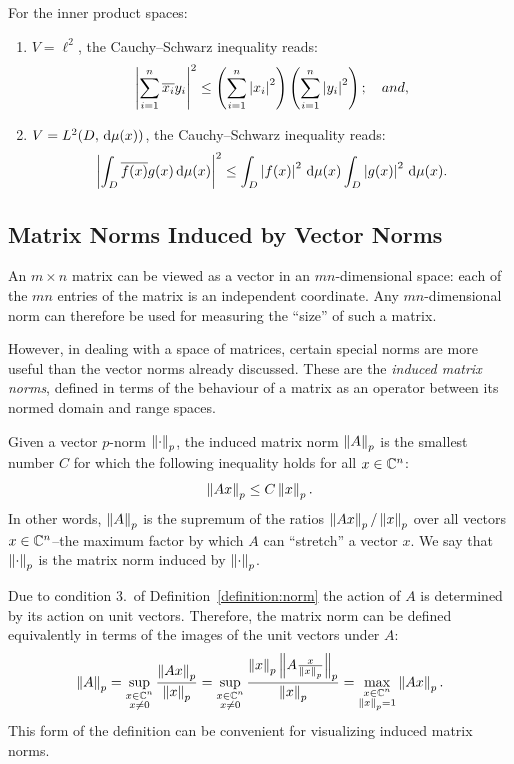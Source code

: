 \begin{example}
For the inner product spaces:
\begin{enumerate}
\item $V=\ell^2$, the Cauchy--Schwarz inequality reads:
\[
\left|{\sum_{i=1}^n \overline{x_i}y_i}\right|^2 \le \left(\sum_{i=1}^n\left|{x_i}\right|^2\right)\left(\sum_{i=1}^n\left|{y_i}\right|^2\right);\quad and,
\]
\item $V=L^2(D,{\rm\,d}\mu(x))$, the Cauchy--Schwarz inequality reads:
\[
\left|{\int_D\overline{f(x)}g(x){\rm\,d}\mu(x)}\right|^2 \le \int_D\left|{f(x)}\right|^2{\rm\,d}\mu(x)\int_D\left|{g(x)}\right|^2{\rm\,d}\mu(x).
\]
\end{enumerate}
\end{example}

\subsection{Matrix Norms Induced by Vector Norms}

An $m\times n$ matrix can be viewed as a vector in an $mn$-dimensional space: each of the $mn$ entries of the matrix is an independent coordinate. Any $mn$-dimensional norm can therefore be used for measuring the ``size'' of such a matrix.

However, in dealing with a space of matrices, certain special norms are more useful than the vector norms already discussed. These are the {\em induced matrix norms}, defined in terms of the behaviour of a matrix as an operator between its normed domain and range spaces.

Given a vector $p$-norm $\left\|{\cdot}\right\|_p$, the induced matrix norm $\left\|{A}\right\|_p$ is the smallest number $C$ for which the following inequality holds for all $x\in\mathbb{C}^n$:
\begin{equation}
\left\|{Ax}\right\|_p \le C\left\|{x}\right\|_p.
\end{equation}
In other words, $\left\|{A}\right\|_p$ is the supremum of the ratios $\left\|{Ax}\right\|_p/\left\|{x}\right\|_p$ over all vectors $x\in\mathbb{C}^n$--the maximum factor by which $A$ can ``stretch'' a vector $x$. We say that $\left\|{\cdot}\right\|_p$ is the matrix norm induced by $\left\|{\cdot}\right\|_p$.

Due to condition 3.~of Definition~\ref{definition:norm} the action of $A$ is determined by its action on unit vectors. Therefore, the matrix norm can be defined equivalently in terms of the images of the unit vectors under $A$:
\begin{equation}
\left\|{A}\right\|_p = \sup_{\substack{x\in\mathbb{C}^n\\x\ne0}}\dfrac{\left\|{Ax}\right\|_p}{\left\|{x}\right\|_p} = \sup_{\substack{x\in\mathbb{C}^n\\x\ne0}}\dfrac{\left\|{x}\right\|_p\left\|{A\frac{x}{\left\|{x}\right\|_p}}\right\|_p}{\left\|{x}\right\|_p} = \max_{\substack{x\in\mathbb{C}^n\\ \left\|{x}\right\|_p = 1}}\left\|{Ax}\right\|_p.
\end{equation}
This form of the definition can be convenient for visualizing induced matrix norms.

